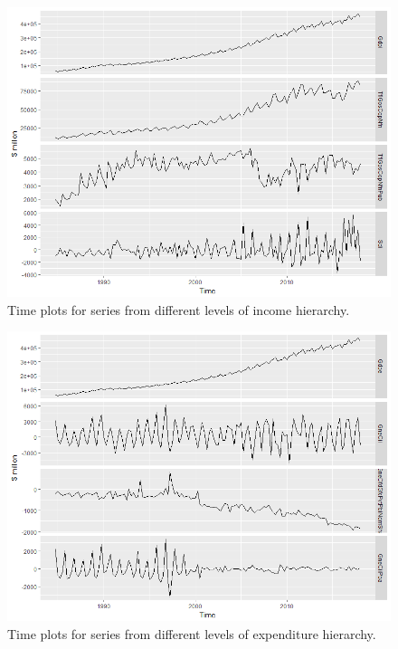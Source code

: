 \documentclass[graybox]{svmult}
\begin{document}
\begin{figure}[H]
	\centering
	\small
	\includegraphics[scale=0.50]{Figs/TS-plots/INC-hierarchy/INC-char-of-levels-TSplots.png}
	\caption{Time plots for series from different levels of income hierarchy.}\label{TS-Inc}
\end{figure}

\begin{figure}[H]
	\centering
	\small
	\includegraphics[scale=0.50]{Figs/TS-plots/EXP-hierarchy/EXP-char-of-levels-TSplots.png}
	\caption{Time plots for series from different levels of expenditure hierarchy.}\label{TS-Exp}
\end{figure}


\clearpage	
\end{document}
